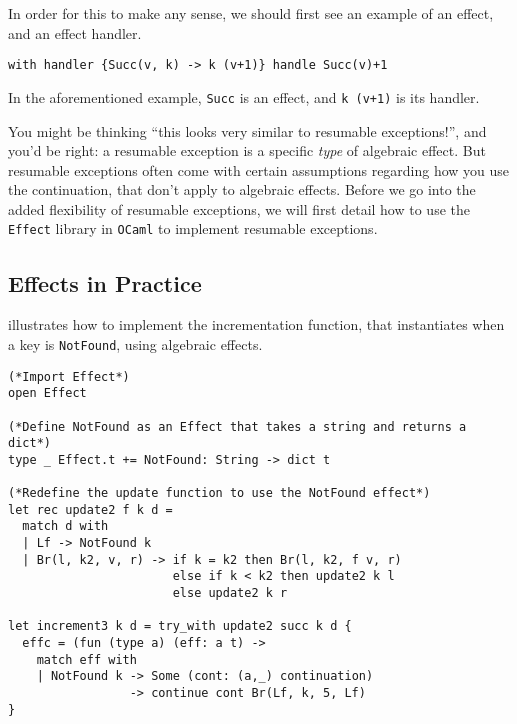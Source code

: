 In order for this to make any sense, we should first see an example of an effect, and an effect handler. 
\begin{verbatim}
with handler {Succ(v, k) -> k (v+1)} handle Succ(v)+1 
\end{verbatim}
In the aforementioned example, \texttt{Succ} is an effect, and \texttt{k (v+1)} is its handler. 

You might be thinking ``this looks very similar to resumable exceptions!'', and you'd be right: a resumable exception is a specific \textit{type} of algebraic effect. But resumable exceptions often come with certain assumptions regarding how you use the continuation, that don't apply to algebraic effects. Before we go into the added flexibility of resumable exceptions, we will first detail how to use the \texttt{Effect} library in \texttt{OCaml} to implement resumable exceptions. 

\subsection{Effects in Practice}
 illustrates how to implement the incrementation function, that instantiates when a key is \texttt{NotFound}, using algebraic effects. 

\begin{code}
\label{code:ocaml-efficient-update}
\begin{verbatim}   
(*Import Effect*)
open Effect

(*Define NotFound as an Effect that takes a string and returns a dict*)
type _ Effect.t += NotFound: String -> dict t

(*Redefine the update function to use the NotFound effect*)
let rec update2 f k d =
  match d with
  | Lf -> NotFound k
  | Br(l, k2, v, r) -> if k = k2 then Br(l, k2, f v, r)
                       else if k < k2 then update2 k l
                       else update2 k r
                       
let increment3 k d = try_with update2 succ k d { 
  effc = (fun (type a) (eff: a t) ->
    match eff with
    | NotFound k -> Some (cont: (a,_) continuation) 
                 -> continue cont Br(Lf, k, 5, Lf)
}
\end{verbatim}
\end{code}

